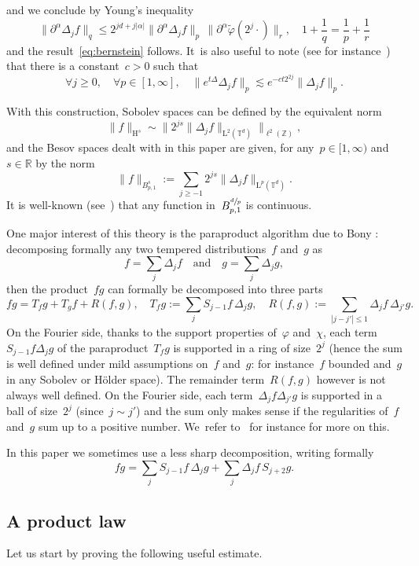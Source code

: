 \documentclass[10pt]{amsart}
\theoremstyle{definition}
\newcommand\R{\mathbb{R}}
\newcommand\T{\mathbb{T}}
\renewcommand\H{\mathrm{H}}
\renewcommand\L{\mathrm{L}}
\begin{document}
and we conclude by Young's inequality
\[
\big\|\partial^\alpha \Delta_j f \big\|_{q} \leq 2^{jd+j|\alpha|}\bigl\|\partial^\alpha \Delta_j f \bigr\|_{p}\,
\bigl\| \partial^\alpha\widetilde\varphi (2^j \cdot) \bigr\|_{r}, \quad 1+\frac1q = \frac1p+ \frac1r
\]
and the result~\eqref{eq:bernstein}
follows. It~is also useful to note (see for instance~\cite[Lem.\,2.4]{BCD}) that there is a constant~$c>0$ such that
\begin{equation}\label{eq:heat}
\forall j \geq 0, \quad \forall p\in[1,\infty], \quad \big\|e^{t\Delta} \Delta_j f \big\|_{p} \lesssim e^{-ct 2^{2j}} \big\|\Delta_j f\big\|_{p}.
\end{equation}

With this construction, Sobolev spaces can be defined by the equivalent norm
\[
\|f\|_{\H^s }\sim \Big\| 2^{js} \| \Delta_j f\|_{\L^2(\T^d)} \Big\|_{\ell^2(\mathbb Z)},
\]
and the Besov spaces dealt with in this paper are given, for any~$p \in [1,\infty)$ and~$s \in \R$ by the norm
\[
\|f\|_{B^s_{p,1}}:= \sum_{j \geq -1} 2^{js} \|\Delta_j f\|_{\L^p(\T^d)}.
\]
It is well-known (see~\cite{BCD}) that any function in~$B^{\sfrac dp}_{p,1}$ is continuous.

One major interest of this theory is the paraproduct algorithm due to Bony \cite{bony}: decomposing formally any two tempered distributions~$f$ and~$g$ as
\[
f = \sum_{j } \Delta_j f \quad \text{and} \quad g = \sum_{j } \Delta_j g,
\]
then the product~$fg$ can formally be decomposed into three parts
\[
fg= T_fg+T_gf+R(f,g), \quad T_fg:=\sum_{j }S_{j-1} f \,\Delta_j g, \quad R(f,g):=\sum_{|j-j'|\leq 1 } \Delta_j f \,\Delta_{j'}g.
\]
On the Fourier side, thanks to the support properties of~$\varphi$ and~$\chi$, each term~$S_{j-1} f \Delta_j g$ of the paraproduct~$ T_fg$ is supported in a ring of size~$2^j$ (hence the sum is well defined under mild assumptions on~$f$ and~$g$: for instance~$f$ bounded and~$g$ in any Sobolev or H\"older space). The remainder term~$ R(f,g)$ however is not always well defined. On the Fourier side, each term~$ \Delta_j f \Delta_{j'}g$ is supported in a ball of size~$2^j$ (since~$j \sim j'$) and the sum only makes sense if the regularities of~$f$ and~$g$ sum up to a positive number. We~refer to~\cite{BCD} for instance for more on this.

In this paper we sometimes use a less sharp decomposition, writing formally
\[
fg= \sum_{j }S_{j-1} f \,\Delta_j g + \sum_{j }\Delta_j f \, S_{j+2}g.
\]

\subsection{A product law}
Let us start by proving the following useful estimate.
\end{document}
